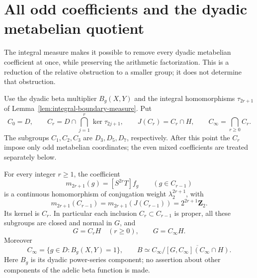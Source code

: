 \section{All odd coefficients and the dyadic metabelian quotient}
\label{sec:uniform-dyadic-normalization}

The integral measure makes it possible to remove every dyadic
metabelian coefficient at once, while preserving the arithmetic
factorization. This is a reduction of the relative obstruction to a
smaller group; it does not determine that obstruction.

Use the dyadic beta multiplier $B_g(X,Y)$ and the integral
homomorphisms $\tau_{2r+1}$ of
Lemma~\ref{lem:integral-boundary-measure}. Put
\[
 C_0=D,\qquad
 C_r=D\cap\bigcap_{j=1}^{r}\ker\tau_{2j+1},\qquad
 J(C_r)=C_r\cap H,\qquad C_\infty=\bigcap_{r\ge0}C_r.
\]
The subgroups $C_1,C_2,C_3$ are $D_3,D_5,D_7$, respectively.
After this point the $C_r$ impose only odd metabelian coordinates;
the even mixed coefficients are treated separately below.

\begin{theorem}\label{thm:uniform-odd-arithmetic-image}
For every integer $r\ge1$, the coefficient
\[
 m_{2r+1}(g)=[S^{2r}T]f_g\qquad(g\in C_{r-1})
\]
is a continuous homomorphism of conjugation weight
$\lambda_2^{2r+1}$, with
\[
 m_{2r+1}(C_{r-1})=m_{2r+1}(J(C_{r-1}))
                 =2^{2r+1}\mathbf Z_2.
\]
Its kernel is $C_r$. In particular each inclusion
$C_r\subset C_{r-1}$ is proper, all these subgroups are closed and
normal in $G$, and
\[
 G=C_rH\quad(r\ge0),\qquad G=C_\infty H.
\]
Moreover
\[
 C_\infty=\{g\in D:B_g(X,Y)=1\},\qquad
 B\simeq C_\infty/
       \overline{[G,C_\infty](C_\infty\cap H)}.
\]
Here $B_g$ is its dyadic power-series component; no assertion about
other components of the adelic beta function is made.
\end{theorem}

